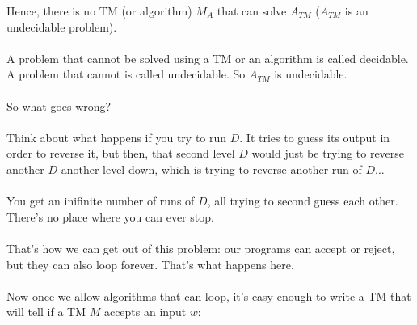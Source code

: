 \documentclass[12pt]{article}
\begin{document}
Hence, there is no TM (or algorithm) $M_A$ that can solve $A_{TM}$ ($A_{TM}$ is an undecidable problem).
\\
\\
A problem that cannot be solved using a TM or an algorithm is called decidable. A problem that cannot is called undecidable. So $A_{TM}$ is undecidable.
\\
\\
So what goes wrong?
\\
\\
Think about what happens if you try to run $D$. It tries to guess its output in order to reverse it, but then, that second level $D$ would just be trying to reverse another $D$ another level down, which is trying to reverse another run of $D$...
\\
\\
You get an inifinite number of runs of $D$, all trying to second guess each other. There's no place where you can ever stop.
\\
\\
That's how we can get out of this problem: our programs can accept or reject, but they can also loop forever. That's what happens here.
\\
\\
Now once we allow algorithms that can loop, it's easy enough to write a TM that will tell if a TM $M$ accepts an input $w$:
\end{document}
